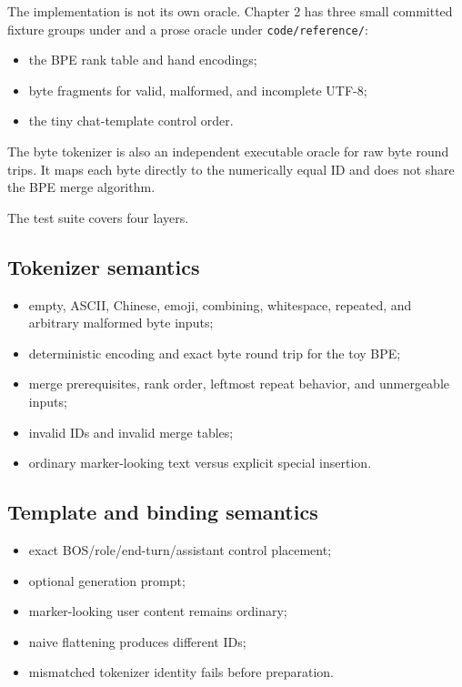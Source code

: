 The implementation is not its own oracle. Chapter 2 has three small
committed fixture groups under
\texttt{} and a prose
oracle under \texttt{code/reference/}:

\begin{itemize}
\tightlist
\item
  the BPE rank table and hand encodings;
\item
  byte fragments for valid, malformed, and incomplete UTF-8;
\item
  the tiny chat-template control order.
\end{itemize}

The byte tokenizer is also an independent executable oracle for raw byte
round trips. It maps each byte directly to the numerically equal ID and
does not share the BPE merge algorithm.

The test suite covers four layers.

\subsection{Tokenizer semantics}\label{tokenizer-semantics}

\begin{itemize}
\tightlist
\item
  empty, ASCII, Chinese, emoji, combining, whitespace, repeated, and
  arbitrary malformed byte inputs;
\item
  deterministic encoding and exact byte round trip for the toy BPE;
\item
  merge prerequisites, rank order, leftmost repeat behavior, and
  unmergeable inputs;
\item
  invalid IDs and invalid merge tables;
\item
  ordinary marker-looking text versus explicit special insertion.
\end{itemize}

\subsection{Template and binding
semantics}\label{template-and-binding-semantics}

\begin{itemize}
\tightlist
\item
  exact BOS/role/end-turn/assistant control placement;
\item
  optional generation prompt;
\item
  marker-looking user content remains ordinary;
\item
  naive flattening produces different IDs;
\item
  mismatched tokenizer identity fails before preparation.
\end{itemize}

